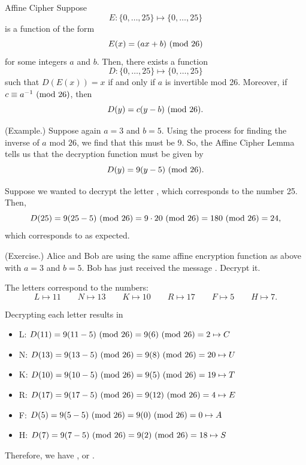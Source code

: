 \documentclass[letterpaper]{article}
\newcommand{\0}{\mathbf{0}}
\begin{document}
\begin{lemma}{Affine Cipher}{}
    Suppose \[E: \{0, \hdots, 25\} \mapsto \{0, \hdots, 25\}\] is a function of the form \[E(x) = (ax + b) \ (\mathrm{mod}\ 26)\] for some integers $a$ and $b$. Then, there exists a function \[D: \{0, \hdots, 25\} \mapsto \{0, \hdots, 25\}\] such that $D(E(x)) = x$ if and only if $a$ is invertible mod 26. Moreover, if $c \equiv a^{-1} \ (\mathrm{mod}\ 26)$, then \[D(y) = c(y - b) \ (\mathrm{mod}\ 26).\]
\end{lemma}

\begin{mdframed}
    (Example.) Suppose again $a = 3$ and $b = 5$. Using the process for finding the inverse of $a$ mod $26$, we find that this must be 9. So, the Affine Cipher Lemma tells us that the decryption function must be given by \[D(y) = 9(y - 5) \ (\mathrm{mod}\ 26).\] 

    Suppose we wanted to decrypt the letter , which corresponds to the number 25. Then, 
    \[D(25) = 9(25 - 5) \ (\mathrm{mod}\ 26) = 9 \cdot 20 \ (\mathrm{mod}\ 26) = 180 \ (\mathrm{mod}\ 26) = 24,\] which corresponds to  as expected.
\end{mdframed}

\begin{mdframed}
    (Exercise.) Alice and Bob are using the same affine encryption function as above with $a = 3$ and $b = 5$. Bob has just received the message . Decrypt it.
    
    \begin{mdframed}
        The letters correspond to the numbers: 
        \[L \mapsto 11 \qquad N \mapsto 13 \qquad K \mapsto 10 \qquad R \mapsto 17 \qquad F \mapsto 5 \qquad H \mapsto 7.\]

        Decrypting each letter results in 
        \begin{itemize}
            \item L: $D(11) = 9(11 - 5) \ (\mathrm{mod}\ 26) = 9(6) \ (\mathrm{mod}\ 26) = 2 \mapsto C$
            \item N: $D(13) = 9(13 - 5) \ (\mathrm{mod}\ 26) = 9(8) \ (\mathrm{mod}\ 26) = 20 \mapsto U$
            \item K: $D(10) = 9(10 - 5) \ (\mathrm{mod}\ 26) = 9(5) \ (\mathrm{mod}\ 26) = 19 \mapsto T$
            \item R: $D(17) = 9(17 - 5) \ (\mathrm{mod}\ 26) = 9(12) \ (\mathrm{mod}\ 26) = 4 \mapsto E$
            \item F: $D(5) = 9(5 - 5) \ (\mathrm{mod}\ 26) = 9(0) \ (\mathrm{mod}\ 26) = 0 \mapsto A$
            \item H: $D(7) = 9(7 - 5) \ (\mathrm{mod}\ 26) = 9(2) \ (\mathrm{mod}\ 26) = 18 \mapsto S$
        \end{itemize}
        Therefore, we have , or \textbf{}.
    \end{mdframed}
\end{mdframed}
\end{document}
